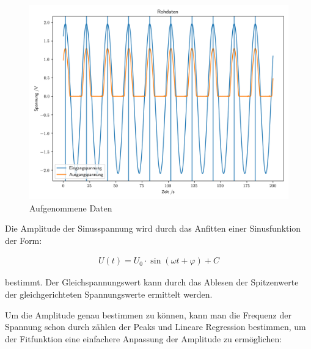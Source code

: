 \documentclass[12pt,twoside,a4paper]{scrartcl}
\begin{document}
			\begin{figure}[H]
				\centering

				\includegraphics[width = 0.8 \textwidth]{Plots/rectifier/Rohdaten}

				\caption{Aufgenommene Daten}
				\label{Gleichrichter::Daten}
			\end{figure}

			Die Amplitude der Sinusspannung wird durch das Anfitten einer Sinusfunktion der Form:

			\begin{align*}
				U(t) = U_0 \cdot \sin(\omega t + \varphi) + C
			\end{align*}

			bestimmt. Der Gleichspannungswert kann durch das Ablesen der Spitzenwerte der gleichgerichteten Spannungswerte ermittelt werden.

			Um die Amplitude genau bestimmen zu können, kann man die Frequenz der Spannung schon durch zählen der Peaks und Lineare Regression bestimmen, um der Fitfunktion eine einfachere Anpassung der Amplitude zu ermöglichen:
\end{document}
